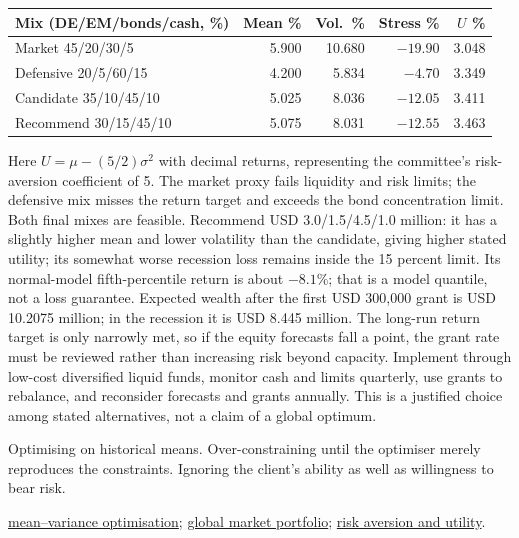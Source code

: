 \begin{qfmethod}
\begin{center}\begin{tabular}{lrrrr}
Mix (DE/EM/bonds/cash, \%) & Mean \% & Vol.\ \% & Stress \% & $U$ \%\\\hline
Market 45/20/30/5 & 5.900 & 10.680 & $-19.90$ & 3.048\\
Defensive 20/5/60/15 & 4.200 & 5.834 & $-4.70$ & 3.349\\
Candidate 35/10/45/10 & 5.025 & 8.036 & $-12.05$ & 3.411\\
Recommend 30/15/45/10 & 5.075 & 8.031 & $-12.55$ & 3.463
\end{tabular}\end{center}
Here $U=\mu-(5/2)\sigma^2$ with decimal returns, representing the committee's risk-aversion coefficient of 5. The market proxy fails liquidity and risk limits; the defensive mix misses the return target and exceeds the bond concentration limit. Both final mixes are feasible. Recommend USD 3.0/1.5/4.5/1.0 million: it has a slightly higher mean and lower volatility than the candidate, giving higher stated utility; its somewhat worse recession loss remains inside the 15 percent limit. Its normal-model fifth-percentile return is about $-8.1\%$; that is a model quantile, not a loss guarantee. Expected wealth after the first USD 300{,}000 grant is USD 10.2075 million; in the recession it is USD 8.445 million. The long-run return target is only narrowly met, so if the equity forecasts fall a point, the grant rate must be reviewed rather than increasing risk beyond capacity. Implement through low-cost diversified liquid funds, monitor cash and limits quarterly, use grants to rebalance, and reconsider forecasts and grants annually. This is a justified choice among stated alternatives, not a claim of a global optimum.

 Optimising on historical means. Over-constraining until the optimiser merely reproduces the constraints. Ignoring the client's ability as well as willingness to bear risk.

 \hyperref[mod:mean-variance-portfolio-optimisation]{mean--variance optimisation}; \hyperref[meth:asset-class-factor-specification]{global market portfolio}; \hyperref[def:risk-aversion-utility]{risk aversion and utility}.

\end{qfmethod}

